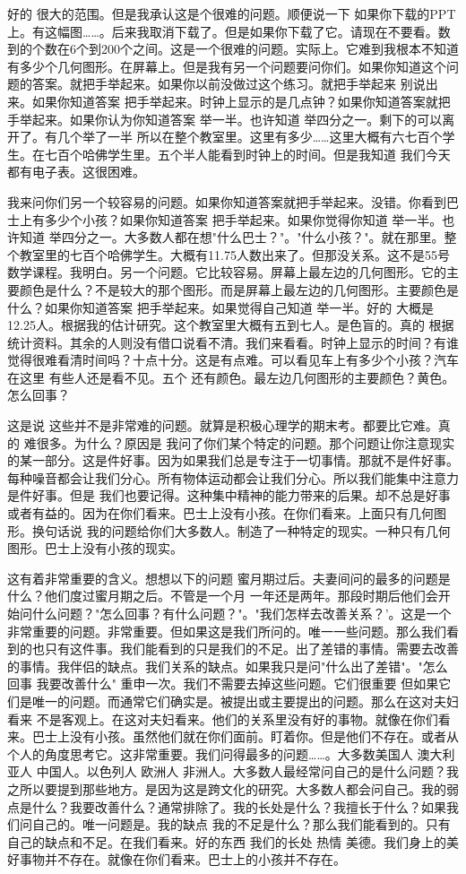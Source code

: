 好的 很大的范围。但是我承认这是个很难的问题。顺便说一下 如果你下载的PPT上。有这幅图……。后来我取消下载了。但是如果你下载了它。请现在不要看。数到的个数在6个到200个之间。这是一个很难的问题。实际上。它难到我根本不知道有多少个几何图形。在屏幕上。但是我有另一个问题要问你们。如果你知道这个问题的答案。就把手举起来。如果你以前没做过这个练习。就把手举起来 别说出来。如果你知道答案 把手举起来。时钟上显示的是几点钟？如果你知道答案就把手举起来。如果你认为你知道答案 举一半。也许知道 举四分之一。剩下的可以离开了。有几个举了一半 所以在整个教室里。这里有多少……这里大概有六七百个学生。在七百个哈佛学生里。五个半人能看到时钟上的时间。但是我知道 我们今天都有电子表。这很困难。 

我来问你们另一个较容易的问题。如果你知道答案就把手举起来。没错。你看到巴士上有多少个小孩？如果你知道答案 把手举起来。如果你觉得你知道 举一半。也许知道 举四分之一。大多数人都在想"什么巴士？"。"什么小孩？"。就在那里。整个教室里的七百个哈佛学生。大概有11.75人数出来了。但那没关系。这不是55号数学课程。我明白。另一个问题。它比较容易。屏幕上最左边的几何图形。它的主要颜色是什么？不是较大的那个图形。而是屏幕上最左边的几何图形。主要颜色是什么？如果你知道答案 把手举起来。如果觉得自己知道 举一半。好的 大概是12.25人。根据我的估计研究。这个教室里大概有五到七人。是色盲的。真的 根据统计资料。其余的人则没有借口说看不清。我们来看看。时钟上显示的时间？有谁觉得很难看清时间吗？十点十分。这是有点难。可以看见车上有多少个小孩？汽车在这里 有些人还是看不见。五个 还有颜色。最左边几何图形的主要颜色？黄色。怎么回事？ 

这是说 这些并不是非常难的问题。就算是积极心理学的期末考。都要比它难。真的 难很多。为什么？原因是 我问了你们某个特定的问题。那个问题让你注意现实的某一部分。这是件好事。因为如果我们总是专注于一切事情。那就不是件好事。每种噪音都会让我们分心。所有物体运动都会让我们分心。所以我们能集中注意力是件好事。但是 我们也要记得。这种集中精神的能力带来的后果。却不总是好事或者有益的。因为在你们看来。巴士上没有小孩。在你们看来。上面只有几何图形。换句话说 我的问题给你们大多数人。制造了一种特定的现实。一种只有几何图形。巴士上没有小孩的现实。 

这有着非常重要的含义。想想以下的问题 蜜月期过后。夫妻间问的最多的问题是什么？他们度过蜜月期之后。不管是一个月 一年还是两年。那段时期后他们会开始问什么问题？"怎么回事？有什么问题？"。"我们怎样去改善关系？'。这是一个非常重要的问题。非常重要。但如果这是我们所问的。唯一一些问题。那么我们看到的也只有这件事。我们能看到的只是我们的不足。出了差错的事情。需要去改善的事情。我伴侣的缺点。我们关系的缺点。如果我只是问"什么出了差错"。"怎么回事 我要改善什么" 重申一次。我们不需要去掉这些问题。它们很重要 但如果它们是唯一的问题。而通常它们确实是。被提出或主要提出的问题。那么在这对夫妇看来 不是客观上。在这对夫妇看来。他们的关系里没有好的事物。就像在你们看来。巴士上没有小孩。虽然他们就在你们面前。盯着你。但是他们不存在。或者从个人的角度思考它。这非常重要。我们问得最多的问题……。大多数美国人 澳大利亚人 中国人。以色列人 欧洲人 非洲人。大多数人最经常问自己的是什么问题？我之所以要提到那些地方。是因为这是跨文化的研究。大多数人都会问自己。我的弱点是什么？我要改善什么？通常排除了。我的长处是什么？我擅长于什么？如果我们问自己的。唯一问题是。我的缺点 我的不足是什么？那么我们能看到的。只有自己的缺点和不足。在我们看来。好的东西 我们的长处 热情 美德。我们身上的美好事物并不存在。就像在你们看来。巴士上的小孩并不存在。 

